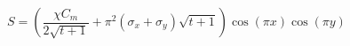 $$
S = \left(\frac{\chi C_m}{2 \sqrt{t + 1}} + \pi^{2} \left(\sigma_x + \sigma_y\right) \sqrt{t + 1}\right) \cos{\left(\pi x \right)} \cos{\left(\pi y \right)}
$$
